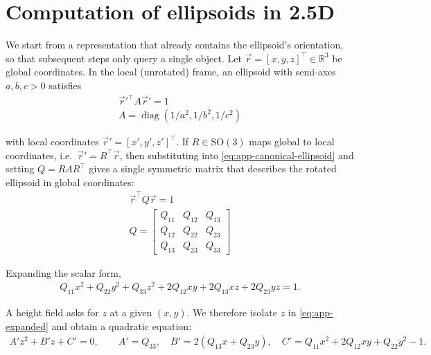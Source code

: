\resetgraphicspath
{}


\chapter{Computation of ellipsoids in 2.5D}
\label{app:ellipsoid-matrix}


We start from a representation that already contains the ellipsoid's orientation, so that subsequent steps only query a single object. Let $\vec r=[x,y,z]^\top \in\mathbb{R}^3$ be global coordinates. In the local (unrotated) frame, an ellipsoid with semi-axes $a,b,c>0$ satisfies
\begin{align}
    \label{eq:app-canonical-ellipsoid}
    \vec r'^\top  A \vec r' = 1 \\
    A=\operatorname{diag}\!\left(1/a^2, 1/b^2, 1/c^2\right)
\end{align}

with local coordinates $\vec r'=[x',y',z']^\top $. If $R\in \mathrm{SO}(3)$ maps global to local coordinates, i.e.\ $\vec r'=R^\top \vec r$, then substituting into \cref{eq:app-canonical-ellipsoid} and setting $Q=RAR^\top $ gives a single symmetric matrix that describes the rotated ellipsoid in global coordinates:
\begin{align}
    \label{eq:app-global-implicit}
    \vec r^\top  Q \vec r = 1 \\
    Q =
    \begin{bmatrix}
        Q_{11} & Q_{12} & Q_{13}\\
        Q_{12} & Q_{22} & Q_{23}\\
        Q_{13} & Q_{23} & Q_{33}
    \end{bmatrix}
\end{align}

Expanding the scalar form,
\begin{align}
    \label{eq:app-expanded}
    Q_{11}x^2 + Q_{22}y^2 + Q_{33}z^2 + 2Q_{12}xy + 2Q_{13}xz + 2Q_{23}yz = 1.
\end{align}

A height field asks for $z$ at a given $(x,y)$. We therefore isolate $z$ in \cref{eq:app-expanded} and obtain a quadratic equation:
\begin{align}
    \label{eq:app-quadratic-coeffs}
    A' z^2 + B' z + C' = 0,
    \qquad
    A' = Q_{33},\quad
    B' = 2(Q_{13}x + Q_{23}y),\quad
    C' = Q_{11}x^2 + 2Q_{12}xy + Q_{22}y^2 - 1.
\end{align}

